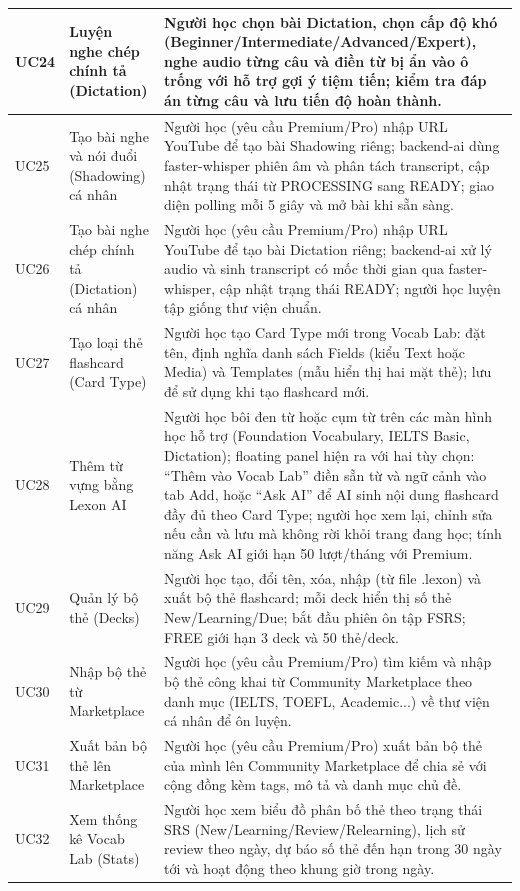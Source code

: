 \begin{longtable}{|p{15\tbu}|p{45\tbu}|p{90\tbu}|}
    UC24 & Luyện nghe chép chính tả (Dictation) & Người học chọn bài Dictation, chọn cấp độ khó (Beginner/Intermediate/Advanced/Expert), nghe audio từng câu và điền từ bị ẩn vào ô trống với hỗ trợ gợi ý tiệm tiến; kiểm tra đáp án từng câu và lưu tiến độ hoàn thành. \\ \hline
    UC25 & Tạo bài nghe và nói đuổi (Shadowing) cá nhân & Người học (yêu cầu Premium/Pro) nhập URL YouTube để tạo bài Shadowing riêng; backend-ai dùng faster-whisper phiên âm và phân tách transcript, cập nhật trạng thái từ PROCESSING sang READY; giao diện polling mỗi 5 giây và mở bài khi sẵn sàng. \\ \hline
    UC26 & Tạo bài nghe chép chính tả (Dictation) cá nhân & Người học (yêu cầu Premium/Pro) nhập URL YouTube để tạo bài Dictation riêng; backend-ai xử lý audio và sinh transcript có mốc thời gian qua faster-whisper, cập nhật trạng thái READY; người học luyện tập giống thư viện chuẩn. \\ \hline
    UC27 & Tạo loại thẻ flashcard (Card Type) & Người học tạo Card Type mới trong Vocab Lab: đặt tên, định nghĩa danh sách Fields (kiểu Text hoặc Media) và Templates (mẫu hiển thị hai mặt thẻ); lưu để sử dụng khi tạo flashcard mới. \\ \hline
    UC28 & Thêm từ vựng bằng Lexon AI & Người học bôi đen từ hoặc cụm từ trên các màn hình học hỗ trợ (Foundation Vocabulary, IELTS Basic, Dictation); floating panel hiện ra với hai tùy chọn: ``Thêm vào Vocab Lab'' điền sẵn từ và ngữ cảnh vào tab Add, hoặc ``Ask AI'' để AI sinh nội dung flashcard đầy đủ theo Card Type; người học xem lại, chỉnh sửa nếu cần và lưu mà không rời khỏi trang đang học; tính năng Ask AI giới hạn 50 lượt/tháng với Premium. \\ \hline
    UC29 & Quản lý bộ thẻ (Decks) & Người học tạo, đổi tên, xóa, nhập (từ file .lexon) và xuất bộ thẻ flashcard; mỗi deck hiển thị số thẻ New/Learning/Due; bắt đầu phiên ôn tập FSRS; FREE giới hạn 3 deck và 50 thẻ/deck. \\ \hline
    UC30 & Nhập bộ thẻ từ Marketplace & Người học (yêu cầu Premium/Pro) tìm kiếm và nhập bộ thẻ công khai từ Community Marketplace theo danh mục (IELTS, TOEFL, Academic...) về thư viện cá nhân để ôn luyện. \\ \hline
    UC31 & Xuất bản bộ thẻ lên Marketplace & Người học (yêu cầu Premium/Pro) xuất bản bộ thẻ của mình lên Community Marketplace để chia sẻ với cộng đồng kèm tags, mô tả và danh mục chủ đề. \\ \hline
    UC32 & Xem thống kê Vocab Lab (Stats) & Người học xem biểu đồ phân bố thẻ theo trạng thái SRS (New/Learning/Review/Relearning), lịch sử review theo ngày, dự báo số thẻ đến hạn trong 30 ngày tới và hoạt động theo khung giờ trong ngày. \\ \hline

\end{longtable}
